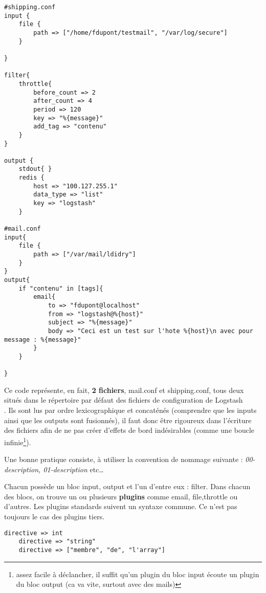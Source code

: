 \begin{lstlisting}[style=logstash,label={lst:conflogstashexample1},caption={Exemple de conf pour mail}]
#shipping.conf
input {
    file {
        path => ["/home/fdupont/testmail", "/var/log/secure"]
    }

}

filter{
    throttle{
        before_count => 2
        after_count => 4
        period => 120
        key => "%{message}"
        add_tag => "contenu"
    }
}

output {
    stdout{ }
    redis {
        host => "100.127.255.1"
        data_type => "list"
        key => "logstash"
    }

#mail.conf
input{
    file {
        path => ["/var/mail/ldidry"]
    }
}
output{
    if "contenu" in [tags]{
        email{
            to => "fdupont@localhost"
            from => "logstash@%{host}"
            subject => "%{message}"
            body => "Ceci est un test sur l'hote %{host}\n avec pour message : %{message}"
        }
    }

}
\end{lstlisting}

Ce code représente, en fait, {\bfseries 2 fichiers}, mail.conf et shipping.conf, tous
deux situés dans le répertoire par défaut des fichiers de configuration de Logstash\\
. Ils sont lus par ordre lexicographique et concaténés 
(comprendre que les inputs ainsi que les outputs sont fusionnés), il faut donc être
rigoureux dans l'écriture des fichiers afin de ne pas créer d'effets de bord indésirables
(comme une boucle infinie\footnote{assez facile à déclancher, il suffit qu'un plugin
du bloc input écoute un plugin du bloc output (ca va vite, surtout avec des mails)}).

Une bonne pratique consiste, à utiliser la convention de nommage suivante : \textit{
00-description, 01-description} etc\ldots


Chacun possède un bloc input, output et l'un d'entre eux : filter.
Dans chacun des blocs, on trouve un ou plusieurs {\bfseries plugins} comme email, 
file,throttle ou d'autres. 
Les plugins standards suivent un syntaxe commune. Ce n'est pas toujours le cas des
plugins tiers. 

\begin{lstlisting}[style=logstash,label={lst:conflogstashsyntaxe1},caption={Syntaxe}]
    directive => int
    directive => "string"
    directive => ["membre", "de", "l'array"]
\end{lstlisting}

